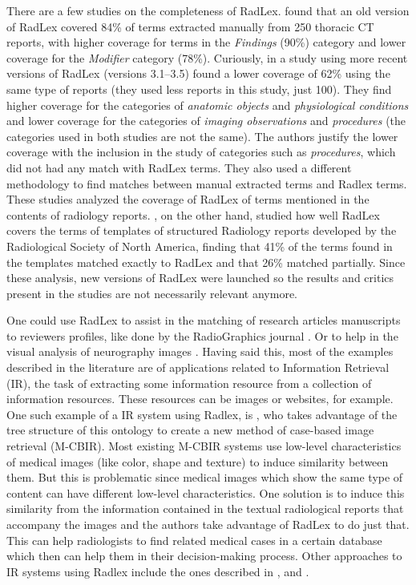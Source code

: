 There are a few studies on the completeness of RadLex. \citep{Marwede2008} found that an old version of RadLex covered 84\% of terms extracted manually from 250 thoracic CT reports, with higher coverage for terms in the \textit{Findings} (90\%) category and lower coverage for the \textit{Modifier} category (78\%). Curiously, in a study using more recent versions of RadLex (versions 3.1–3.5) \citep{Woods2013} found a lower coverage of 62\% using the same type of reports (they used less reports in this study, just 100). They find higher coverage for the categories of \textit{anatomic objects} and \textit{physiological conditions} and lower coverage for the categories of \textit{imaging observations} and \textit{procedures} (the categories used in both studies are not the same). The authors justify the lower coverage with the inclusion in the study of categories such as \textit{procedures}, which did not had any match with RadLex terms. They also used a different methodology to find matches between manual extracted terms and Radlex terms. These studies analyzed the coverage of RadLex of terms mentioned in the contents of radiology reports. \citep{Hong2012}, on the other hand, studied how well RadLex covers the terms of templates of structured Radiology reports developed by the Radiological Society of North America, finding that 41\% of the terms found in the templates matched exactly to RadLex and that 26\% matched partially. Since these analysis, new versions of RadLex were launched so the results and critics present in the studies are not necessarily relevant anymore.

One could use RadLex to assist in the matching of research articles manuscripts to reviewers profiles, like done by the RadioGraphics journal \citep{Klein2013}. Or to help in the visual analysis of neurography images \citep{Wang2015}. Having said this, most of the examples described in the literature are of applications related to Information Retrieval (IR), the task of extracting some information resource from a collection of information resources. These resources can be images or websites, for example. One such example of a IR system using Radlex, is \citep{Spanier2016}, who takes advantage of the tree structure of this ontology to create a new method of case-based image retrieval (M-CBIR). Most existing M-CBIR systems use low-level characteristics of medical images (like color, shape and texture) to induce similarity between them. But this is problematic since medical images which show the same type of content can have different low-level characteristics. One solution is to induce this similarity from the information contained in the textual radiological reports that accompany the images and the authors take advantage of RadLex to do just that. This can help radiologists to find related medical cases in a certain database which then can help them in their decision-making process. Other approaches to IR systems using Radlex include the ones described in \citep{Do2010}, \citep{Kurtz2014} and \citep{Gerstmair2012}.


